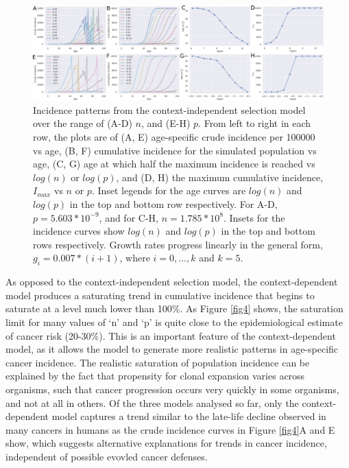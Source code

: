 \documentclass[9pt,twocolumn,twoside]{pnas-new}
\begin{document}
\begin{figure}[tbhp]
	\centering
	\includegraphics[width=.8\linewidth]{fig3.png}
	\caption{Incidence patterns from the context-independent selection model over the range of (A-D) $n$, and (E-H) $p$. From left to right in each row, the plots are of (A, E) age-specific crude incidence per 100000 vs age, (B, F) cumulative incidence for the simulated population vs age, (C, G) age at which half the maximum incidence is reached vs $log(n)$ or $log(p)$, and (D, H) the maximum cumulative incidence, $I_{max}$ vs $n$ or $p$. Inset legends for the age curves are $log(n)$ and $log(p)$ in the top and bottom row respectively. For A-D, $p=5.603*10^{-9}$, and for C-H, $n=1.785*10^{8}$. Insets for the incidence curves show $log(n)$ and $log(p)$ in the top and bottom rows respectively. Growth rates progress linearly in the general form, $g_{i}=0.007*(i+1)$, where $i=0,...,k$ and $k=5$.}
	\label{fig3}
\end{figure}

As opposed to the context-independent selection model, the context-dependent model produces a saturating trend in cumulative incidence that begins to saturate at a level much lower than 100\%. As Figure \ref{fig4} shows, the saturation limit for many values of ‘n’ and ‘p’ is quite close to the epidemiological estimate of cancer risk (20-30\%). This is an important feature of the context-dependent model, as it allows the model to generate more realistic patterns in age-specific cancer incidence. The realistic saturation of population incidence can be explained by the fact that propensity for clonal expansion varies across organisms, such that cancer progression occurs very quickly in some organisms, and not at all in others. Of the three models analysed so far, only the context-dependent model captures a trend similar to the late-life decline observed in many cancers in humans as the crude incidence curves in Figure \ref{fig4}A and E show, which suggests alternative explanations for trends in cancer incidence, independent of possible evovled cancer defenses.
\end{document}

